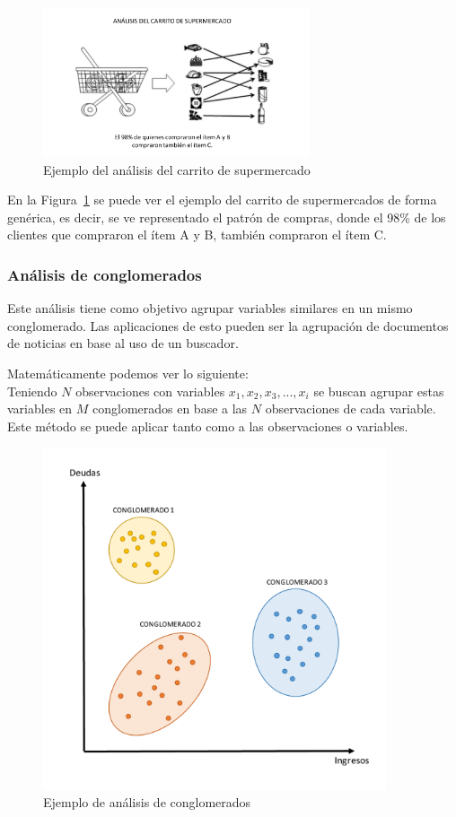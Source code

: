 \begin{figure}[H]
  \centering
    \includegraphics[width=0.7\textwidth]{Figuras/Carrito}
      \caption{Ejemplo del análisis del carrito de supermercado}
    \label{fig:carrito}
\end{figure}

En la Figura~\ref{fig:carrito} se puede ver el ejemplo del carrito de supermercados de forma genérica, es decir, se ve representado el patrón de compras, donde el 98\% de los clientes que compraron el ítem A y B, también compraron el ítem C. 

\subsubsection{Análisis de conglomerados}
Este análisis tiene como objetivo agrupar variables similares en un mismo conglomerado. Las aplicaciones de esto pueden ser la agrupación de documentos de noticias en base al uso de un buscador.

Matemáticamente podemos ver lo siguiente:\\
Teniendo $N$ observaciones con variables $x_1, x_2, x_3, ... , x_i$ se buscan agrupar estas variables en $M$ conglomerados en base a las $N$ observaciones de cada variable. Este método se puede aplicar tanto como a las observaciones o variables.

\begin{figure}[H]
  \centering
    \includegraphics[width=0.9\textwidth]{Figuras/Conglomerados}
      \caption{Ejemplo de análisis de conglomerados}
    \label{fig:conglomerado}
\end{figure}

